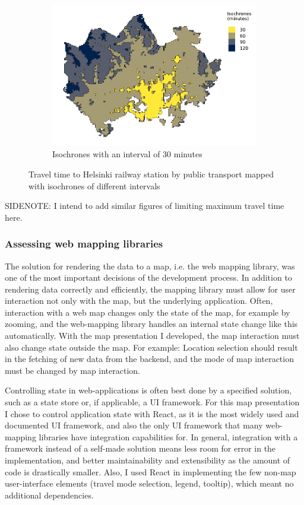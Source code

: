 \begin{figure}[H]
\begin{subfigure}[b]{0.5\textwidth}
		\includegraphics[width=\textwidth]{visual/figures/ttm/isochrone_interval_30.pdf}
		\caption{Isochrones with an interval of 30 minutes}
		\label{fig:interval 30}
	\end{subfigure}%
	\caption{Travel time to Helsinki railway station by public transport mapped with isochrones of different intervals}
	\label{fig:isochrones}
\end{figure}

SIDENOTE: I intend to add similar figures of limiting maximum travel time here.

\subsubsection{Assessing web mapping libraries}

The solution for rendering the data to a map, i.e. the web mapping library,
was one of the most important decisions of the development process. 
In addition to rendering data correctly and efficiently,
the mapping library must allow for user interaction not only with the map,
but the underlying application.
Often, interaction with a web map changes only the state of the map,
for example by zooming,
and the web-mapping library handles an internal state change like this automatically.
With the map presentation I developed,
the map interaction must also change state outside the map.
For example:
Location selection should result in the fetching of new data from the backend,
and the mode of map interaction must be changed by map interaction.

Controlling state in web-applications is often best done by a specified solution,
such as a state store or, if applicable, a UI framework.
For this map presentation I chose to control application state with React,
as it is the most widely used and documented UI framework,
and also the only UI framework that many web-mapping libraries have integration capabilities for.
In general, integration with a framework instead of a self-made solution
means less room for error in the implementation,
and better maintainability and extensibility as the amount of code is drastically smaller.
Also, I used React in implementing the few non-map user-interface elements
(travel mode selection, legend, tooltip),
which meant no additional dependencies.

